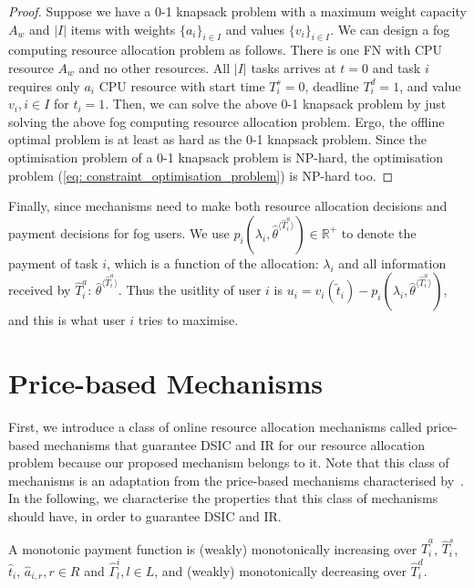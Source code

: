 \documentclass[11pt]{phdthesis}
\begin{document}
\begin{proof}
    Suppose we have a 0-1 knapsack problem with a maximum weight capacity $ A_w $ and $ |I| $ items with weights $ \{ a_i \}_{i \in I} $ and values $ \{ v_i \}_{i \in I} $. We can design a fog computing resource allocation problem as follows. There is one FN with CPU resource $ A_w $ and no other resources. All $ |I| $ tasks arrives at $ t = 0 $ and task $ i $ requires only $  a_i $ CPU resource with start time $ T_i^s = 0 $, deadline $ T_i^d = 1 $, and value $ v_i, i \in I $ for $ t_i=1 $. Then, we can solve the above 0-1 knapsack problem by just solving the above fog computing resource allocation problem. Ergo, the offline optimal problem is at least as hard as the 0-1 knapsack problem. Since the optimisation problem of a 0-1 knapsack problem is NP-hard, the optimisation problem (\ref{eq: constraint_optimisation_problem}) is NP-hard too.
\end{proof}

Finally, since mechanisms need to make both resource allocation decisions and payment decisions for fog users. We use $p_i(\lambda_i, \hat{\theta}^{\langle \hat{T}_i^a \rangle}) \in \mathbb{R}^+ $ to denote the payment of task $i$, which is a function of the allocation: $ \lambda_i  $ and all information received by $ \hat{T}_i^a $: $ \hat{\theta}^{\langle \hat{T}_i^a \rangle} $. Thus the usitlity of user $ i $ is $ u_i = v_i(\tilde{t}_i) - p_i(\lambda_i, \hat{\theta}^{\langle \hat{T}_i^a \rangle})$, and this is what user $ i $ tries to maximise.

\section{Price-based Mechanisms} \label{price-based mechanisms}

First, we introduce a class of online resource allocation mechanisms called price-based mechanisms that guarantee DSIC and IR for our resource allocation problem because our proposed mechanism belongs to it. Note that this class of mechanisms is an adaptation from the price-based mechanisms characterised by~\citet{hayakawa2018price}. In the following, we characterise the properties that this class of mechanisms should have, in order to guarantee DSIC and IR.

\begin{definition}\label{df: monotonicity}
    A monotonic payment function is (weakly) monotonically increasing over $\hat{T}_i^a$, $\hat{T}_i^s$, $ \hat{t}_i $, $ \hat{a}_{i,r}, r \in R $ and $  \hat{\Gamma}_l^i, l \in L $, and (weakly) monotonically decreasing over $\hat{T}_i^d$.
\end{definition}
\end{document}
